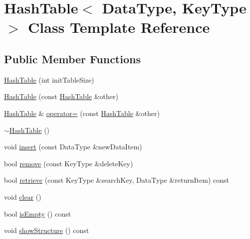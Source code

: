 \hypertarget{class_hash_table}{\section{Hash\+Table$<$ Data\+Type, Key\+Type $>$ Class Template Reference}
\label{class_hash_table}
}
\subsection*{Public Member Functions}
\begin{DoxyCompactItemize}
\item 
\hyperlink{class_hash_table_a103b09f30dbac0fe92fc2f1192feb0c1}{Hash\+Table} (int init\+Table\+Size)
\item 
\hyperlink{class_hash_table_a5da00f8a0dc9dc745675a96eac228049}{Hash\+Table} (const \hyperlink{class_hash_table}{Hash\+Table} \&other)
\item 
\hyperlink{class_hash_table}{Hash\+Table} \& \hyperlink{class_hash_table_add76a73a92b81a2d54c20078d4a76546}{operator=} (const \hyperlink{class_hash_table}{Hash\+Table} \&other)
\item 
\hyperlink{class_hash_table_ae25eb9c66b9bce8c9c04f18e22688a15}{$\sim$\+Hash\+Table} ()
\item 
void \hyperlink{class_hash_table_adc8f2be061729bdc5ecb171b54304e17}{insert} (const Data\+Type \&new\+Data\+Item)
\item 
bool \hyperlink{class_hash_table_a46d3f8ad70fd80dc7aa64f50676ef7a5}{remove} (const Key\+Type \&delete\+Key)
\item 
bool \hyperlink{class_hash_table_ad4ee3ff641daa330260a48de29492e66}{retrieve} (const Key\+Type \&search\+Key, Data\+Type \&return\+Item) const 
\item 
void \hyperlink{class_hash_table_a57f581334e35d45a8822c03edc0fcca6}{clear} ()
\item 
bool \hyperlink{class_hash_table_a101e211a7fca37cd90722e15df2fc571}{is\+Empty} () const 
\item 
void \hyperlink{class_hash_table_a8b875e57f71a5bbba394e42361fb9fb4}{show\+Structure} () const 
\end{DoxyCompactItemize}


